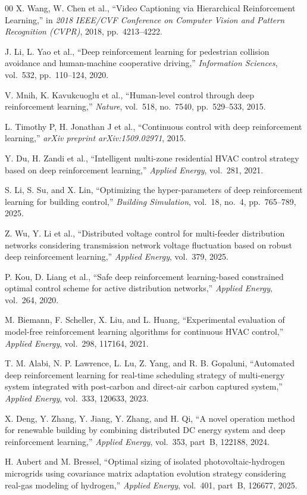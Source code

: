 \begin{thebibliography}{00}
X. Wang, W. Chen et al., ``Video Captioning via Hierarchical Reinforcement Learning,'' in \emph{2018 IEEE/CVF Conference on Computer Vision and Pattern Recognition (CVPR)}, 2018, pp.~4213--4222.

J. Li, L. Yao et al., ``Deep reinforcement learning for pedestrian collision avoidance and human-machine cooperative driving,'' \emph{Information Sciences}, vol.~532, pp.~110--124, 2020.

V. Mnih, K. Kavukcuoglu et al., ``Human-level control through deep reinforcement learning,'' \emph{Nature}, vol.~518, no.~7540, pp.~529--533, 2015.

L. Timothy P, H. Jonathan J et al., ``Continuous control with deep reinforcement learning,'' \emph{arXiv preprint arXiv:1509.02971}, 2015.

Y. Du, H. Zandi et al., ``Intelligent multi-zone residential HVAC control strategy based on deep reinforcement learning,'' \emph{Applied Energy}, vol.~281, 2021.

S. Li, S. Su, and X. Lin, ``Optimizing the hyper-parameters of deep reinforcement learning for building control,'' \emph{Building Simulation}, vol.~18, no.~4, pp.~765--789, 2025.

Z. Wu, Y. Li et al., ``Distributed voltage control for multi-feeder distribution networks considering transmission network voltage fluctuation based on robust deep reinforcement learning,'' \emph{Applied Energy}, vol.~379, 2025.

P. Kou, D. Liang et al., ``Safe deep reinforcement learning-based constrained optimal control scheme for active distribution networks,'' \emph{Applied Energy}, vol.~264, 2020.

M. Biemann, F. Scheller, X. Liu, and L. Huang, ``Experimental evaluation of model-free reinforcement learning algorithms for continuous HVAC control,'' \emph{Applied Energy}, vol.~298, 117164, 2021.

T. M. Alabi, N. P. Lawrence, L. Lu, Z. Yang, and R. B. Gopaluni, ``Automated deep reinforcement learning for real-time scheduling strategy of multi-energy system integrated with post-carbon and direct-air carbon captured system,'' \emph{Applied Energy}, vol.~333, 120633, 2023.

X. Deng, Y. Zhang, Y. Jiang, Y. Zhang, and H. Qi, ``A novel operation method for renewable building by combining distributed DC energy system and deep reinforcement learning,'' \emph{Applied Energy}, vol.~353, part~B, 122188, 2024.

H. Aubert and M. Bressel, ``Optimal sizing of isolated photovoltaic-hydrogen microgrids using covariance matrix adaptation evolution strategy considering real-gas modeling of hydrogen,'' \emph{Applied Energy}, vol.~401, part~B, 126677, 2025.

\end{thebibliography}
